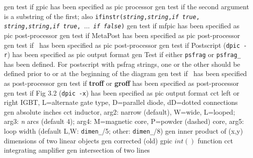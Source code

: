   {gen}
  {test if gpic has been specified as pic processor}
  {gen}
  {test if the second argument is a substring of the first; also
  {\tt ifinstr({\sl string},{\sl string},{\sl if true},{\sl
  string},{\sl string},{\sl if true}, $\ldots$ {\sl if false})}
    }
  {gen}
  {test if mfpic has been specified as pic post-processor}
  {gen}
  {test if MetaPost has been specified as pic post-processor}
  {gen}
  {test if \TPGF~has been specified as pic post-processor}
  {gen}
  {test if Postscript ({\tt dpic -r}) has been specified as pic output format}
  {gen}
  {Test if either {\tt psfrag} or {\tt psfrag\_} has been defined. For
   postscript with psfrag strings, one or the other should be defined
   prior to or at the beginning of the diagram}
  {gen}
  {test if \PSTricks~has been specified as post-processor}
  {gen}
  {test if {\bf troff} or {\bf groff} has been specified as post-processor}
  {gen}
  {test if Fig 3.2 ({\tt dpic -x}) has been specified as pic output format}
  {cct}
  {left or right IGBT, L=alternate gate type, D=parallel diode,
   dD=dotted connections }
  {gen}
  {absolute inches}
  {cct}
  {inductor, arg2: narrow (default), W=wide, L=looped;
   arg3: {\sl n} arcs (default 4);
   arg4: M=magnetic core, P=powder (dashed) core,
   arg5: loop width (default L,W: {\tt dimen\_}/5; other: {\tt dimen\_}/8)
   }
  {gen}
  {inner product of (x,y) dimensions of two linear objects}
  {gen}
  {corrected (old) gpic $int()$ function}
  {cct}
  {integrating amplifier}
  {gen}
  {intersection of two lines}

